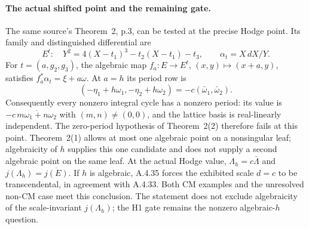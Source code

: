 \paragraph{The actual shifted point and the remaining gate.}
The same source's Theorem~2, p.3, can be tested at the precise Hodge
point. Its family and distinguished differential are
\[
 E^t:\quad Y^2=4(X-t_1)^3-t_2(X-t_1)-t_3,
 \qquad \alpha_t=X\,dX/Y.
\]
For $t=(a,g_2,g_3)$, the algebraic map
$f_a:E\to E^t$, $(x,y)\mapsto(x+a,y)$, satisfies
$f_a^*\alpha_t=\xi+a\omega$.
At $a=h$ its period row is
\[
 (-\eta_1+h\omega_1,-\eta_2+h\omega_2)
       =-c(\bar\omega_1,\bar\omega_2).
\]
Consequently every nonzero integral cycle has a nonzero period:
its value is $-c\,\overline{m\omega_1+n\omega_2}$ with
$(m,n)\ne(0,0)$, and the lattice basis is real-linearly independent.
The zero-period hypothesis of Theorem~2(2) therefore fails at this
point. Theorem~2(1) allows at most one algebraic point on a nonsingular
leaf; algebraicity of $h$ supplies this one candidate and does not
supply a second algebraic point on the same leaf.
At the actual Hodge value,
$\Lambda_h=c\bar\Lambda$ and $j(\Lambda_h)=\overline{j(E)}$.
If $h$ is algebraic, A.4.35 forces the exhibited scale $d=c$ to be
transcendental, in agreement with A.4.33. Both CM examples and the
unresolved non-CM case meet this conclusion. The statement does not
exclude algebraicity of the scale-invariant $j(\Lambda_h)$; the H1
gate remains the nonzero algebraic-$h$ question.
